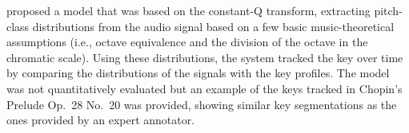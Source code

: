 
\textcite{purwins2000new} proposed a model that was based on
the constant-Q transform, extracting pitch-class
distributions from the audio signal based on a few basic
music-theoretical assumptions (i.e., octave equivalence and
the division of the octave in the chromatic scale). Using
these distributions, the system tracked the key over time by
comparing the distributions of the signals with the
\textcite{krumhansl1982tracing} key profiles. The model was
not quantitatively evaluated but an example of the keys
tracked in Chopin's Prelude Op.~28 No.~20 was provided,
showing similar key segmentations as the ones provided by an
expert annotator.



